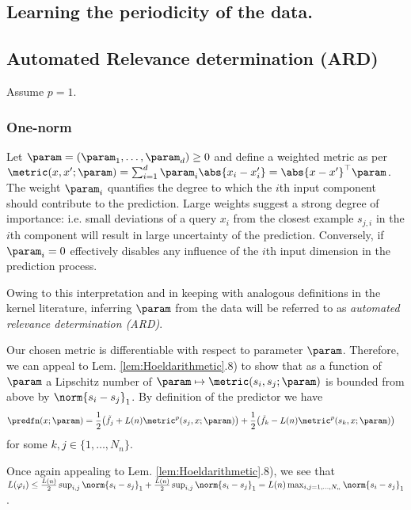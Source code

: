  \subsection{Learning the periodicity of the data.}
 
 
 
 \subsection{Automated Relevance determination (ARD) }
 Assume $p=1$.
 
 \subsubsection{One-norm}
 Let $\param =  (\param_1,\ldots,\param_d) \geq 0$ and define a weighted metric as per $\metric(x,x';\param) = \sum_{i=1}^d \param_i \abs{x_i-x_i'} = \abs{x-x'}^\top \param$. The weight $\param_i$ quantifies the degree to which the $i$th input component should contribute to the prediction. Large weights suggest a strong degree of importance: i.e. small deviations of a query $x_i$ from the closest example $s_{j,i}$ in the $i$th component will result in large uncertainty of the prediction. Conversely, if $\param_i=0$ effectively disables any influence of the $i$th input dimension in the prediction process.
 
Owing to this interpretation and in keeping with analogous definitions in the kernel literature, inferring $\param$ from the data will be referred to as \emph{automated relevance determination (ARD)}. 

Our chosen metric is differentiable with respect to parameter $\param$. Therefore, we can appeal to Lem. \ref{lem:Hoeldarithmetic}.8) to show that as a function of $\param$ a Lipschitz number of $\param \mapsto \metric(s_i,s_j;\param)$ is bounded from above by 
$\norm{s_i-s_j} _1$. By definition of the predictor we have \begin{align}
\predfn(x;\param) &= \frac 1 2 \bigl( \tilde f_j + L(n) \metric^p(s_j,x;\param)   \bigr) + \frac 1 2 \bigl( \tilde  f_k - L(n) \metric^p(s_k,x;\param) \bigr)
\end{align}
for some $k,j \in\{1,\ldots,N_n\}$.

Once again appealing to Lem. \ref{lem:Hoeldarithmetic}.8), we see that 
$L(\varphi_i) \leq \frac {L(n)} 2 \sup_{i,j} \norm{s_i-s_j} _1+ \frac {L(n)} 2 \sup_{i,j} \norm{s_i-s_j} _1 = {L(n)} \max_{i,j=1,...,N_n} \norm{s_i-s_j} _1$.

